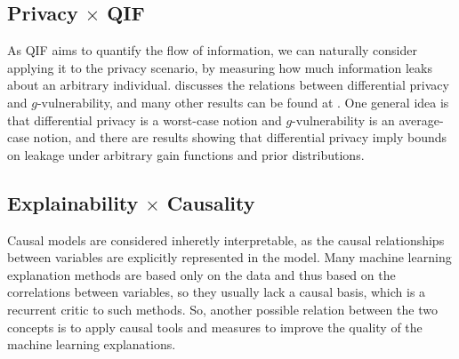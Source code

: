\subsection{Privacy $\times$ QIF}

As QIF aims to quantify the flow of information, we can naturally consider applying it to the privacy scenario, by measuring how much information leaks about an arbitrary individual. \cite{On the information leakage of Differentially Private Mechanisms} discusses the relations between differential privacy and $g$-vulnerability, and many other results can be found at \cite{QIF}. One general idea is that differential privacy is a worst-case notion and $g$-vulnerability is an average-case notion, and there are results showing that differential privacy imply bounds on leakage under arbitrary gain functions and prior distributions.

\subsection{Explainability $\times$ Causality}

Causal models are considered inheretly interpretable, as the causal relationships between variables are explicitly represented in the model. Many machine learning explanation methods are based only on the data and thus based on the correlations between variables, so they usually lack a causal basis, which is a recurrent critic to such methods. So, another possible relation between the two concepts is to apply causal tools and measures to improve the quality of the machine learning explanations.


